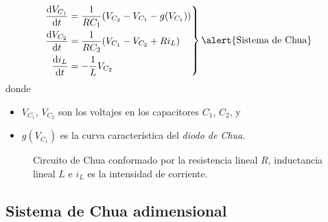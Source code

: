 \begin{frame}
	\begin{minipage}{0.55\textwidth}
		\begin{equation}\label{eq:chua}
			\left.
			\begin{aligned}
				\diff{V_{C_{1}}}{t} & =\frac{1}{RC_{1}}(V_{C_{2}} - V_{C_{1}} - g(V_{C_{1}})) \\
				\diff{V_{C_{2}}}{t} & =\frac{1}{RC_{2}}(V_{C_{1}} - V_{C_{2}} + Ri_{L})       \\
				\diff{i_{L}}{t}     & =-\frac{1}{L}V_{C_{2}}
			\end{aligned}
			\right\}
			\text{\alert{Sistema de Chua}}
		\end{equation}
		donde
		\begin{itemize}
			\item $V_{C_{1}}$, $V_{C_{2}}$ son los voltajes en los capacitores $C_{1}$, $C_{2}$, y
			\item $g\left(V_{C_{1}}\right)$ es la curva característica del \emph{diodo de Chua}.
		\end{itemize}
	\end{minipage}
	\begin{minipage}{0.35\textwidth}
		\begin{figure}[ht!]
			\centering
			
			\caption{Circuito de Chua conformado por la resistencia lineal $R$,
				inductancia lineal $L$ e $i_{L}$ es la intensidad de corriente.}\label{fig:chua_circuit}
		\end{figure}
	\end{minipage}

\end{frame}

\subsection{Sistema de Chua adimensional} %

